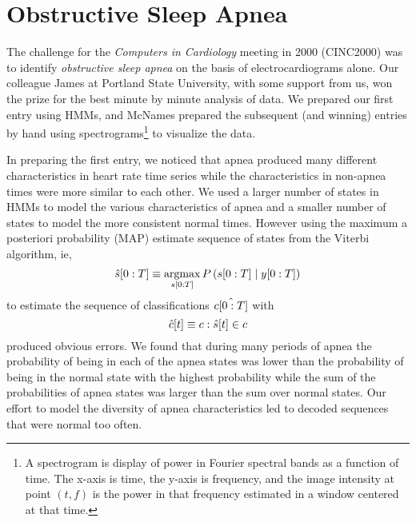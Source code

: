 
\chapter{Obstructive Sleep Apnea}
\label{chap:apnea}

The challenge for the \emph{Computers in Cardiology} %
%
meeting in 2000 (CINC2000) %
%
was to identify \emph{obstructive sleep apnea} on the basis of
electrocardiograms alone.  Our colleague James  at
Portland State University, with some support from us, won the prize
for the best minute by minute analysis of data.  We prepared our first
entry using HMMs, and McNames prepared the subsequent (and winning)
entries by hand using spectrograms\footnote{A spectrogram is display
  of power in Fourier spectral bands as a function of time.  The
  x-axis is time, the y-axis is frequency, and the image intensity at
  point $(t,f)$ is the power in that frequency estimated in a window
  centered at that time.} to visualize the data.  

In preparing the first entry, we noticed that apnea produced many
different characteristics in heart rate time series while the
characteristics in non-apnea times were more similar to each other.  We
used a larger number of states in HMMs to model the various
characteristics of apnea and a smaller number of states to model the
more consistent normal times.  However using the maximum a posteriori
probability (MAP) estimate sequence of states from the Viterbi
algorithm, ie,
\begin{equation*}
  \hat s[0:T] \equiv
  \operatorname*{argmax}_{s[0:T]}P\left(s[0:T] \mid  y[0:T] \right)
\end{equation*}
to estimate the sequence of classifications $\hat {c[0:T]}$ with
\begin{equation*}
  {\hat c}{[t]} \equiv c: {\hat s}{[t]} \in c
\end{equation*}
produced obvious errors.  We found that during many periods of apnea
the probability of being in each of the apnea states was lower than
the probability of being in the normal state with the highest
probability while the sum of the probabilities of apnea states was
larger than the sum over normal states.  Our effort to model the
diversity of apnea characteristics led to decoded sequences that were
normal too often.

